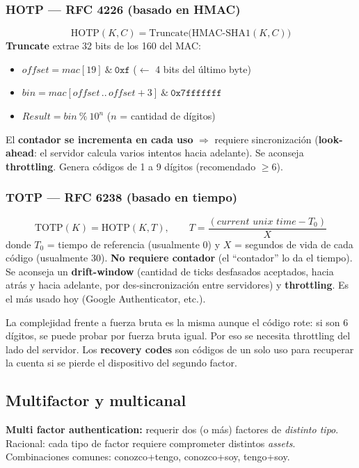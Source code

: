 \documentclass[../main.tex]{subfiles}
\begin{document}
\subsubsection{HOTP --- RFC 4226 (basado en HMAC)}
$$\text{HOTP}(K,C)=\text{Truncate}\big(\text{HMAC-SHA1}(K,C)\big)$$
\textbf{Truncate} extrae 32 bits de los 160 del MAC:
\begin{itemize}[itemsep=1pt]
  \item $\textit{offset} = mac[19]\ \&\ \texttt{0xf}$ \quad ($\leftarrow$ 4 bits del último byte)
  \item $\textit{bin} = mac[\textit{offset}\,..\,\textit{offset}{+}3]\ \&\ \texttt{0x7fffffff}$
  \item $\textit{Result} = \textit{bin}\ \%\ 10^{n}$ \quad ($n$ = cantidad de dígitos)
\end{itemize}
El \textbf{contador se incrementa en cada uso} $\Rightarrow$ requiere sincronización (\textbf{look-ahead}: el servidor calcula varios intentos hacia adelante). Se aconseja \textbf{throttling}. Genera códigos de 1 a 9 dígitos (recomendado $\ge 6$).

\subsubsection{TOTP --- RFC 6238 (basado en tiempo)}
$$\text{TOTP}(K)=\text{HOTP}(K,T), \qquad T=\frac{(\textit{current unix time}-T_0)}{X}$$
donde $T_0$ = tiempo de referencia (usualmente $0$) y $X$ = segundos de vida de cada código (usualmente $30$). \textbf{No requiere contador} (el ``contador'' lo da el tiempo). Se aconseja un \textbf{drift-window} (cantidad de ticks desfasados aceptados, hacia atrás y hacia adelante, por des-sincronización entre servidores) y \textbf{throttling}. Es el más usado hoy (Google Authenticator, etc.).

\begin{destacado}
La complejidad frente a fuerza bruta es la misma aunque el código rote: si son 6 dígitos, se puede probar por fuerza bruta igual. Por eso se necesita throttling del lado del servidor. Los \textbf{recovery codes} son códigos de un solo uso para recuperar la cuenta si se pierde el dispositivo del segundo factor.
\end{destacado}

\subsection{Multifactor y multicanal}

\textbf{Multi factor authentication:} requerir dos (o más) factores de \emph{distinto tipo}. Racional: cada tipo de factor requiere comprometer distintos \emph{assets}. Combinaciones comunes: conozco+tengo, conozco+soy, tengo+soy.
\end{document}
